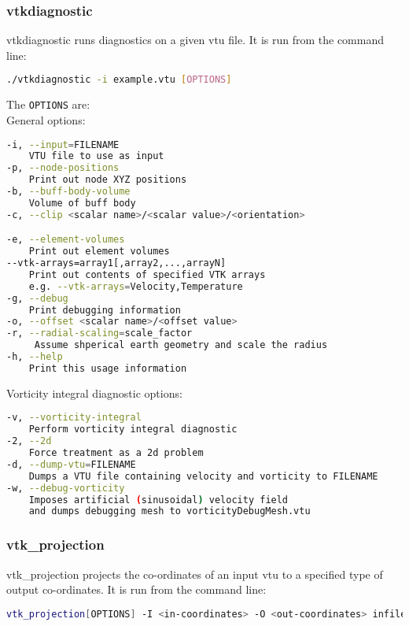 \subsubsection{vtkdiagnostic}
\label{sect:vtkdiagnostic}
vtkdiagnostic runs diagnostics on a given vtu file. It is run from the command line:
\begin{lstlisting}[language = Bash]
./vtkdiagnostic -i example.vtu [OPTIONS]
\end{lstlisting}

The \lstinline[language = Bash]+OPTIONS+ are: \\
General options:
\begin{lstlisting}[language = Bash]
-i, --input=FILENAME
	VTU file to use as input
-p, --node-positions
	Print out node XYZ positions
-b, --buff-body-volume
	Volume of buff body
-c, --clip <scalar name>/<scalar value>/<orientation>

-e, --element-volumes
	Print out element volumes
--vtk-arrays=array1[,array2,...,arrayN]
	Print out contents of specified VTK arrays
	e.g. --vtk-arrays=Velocity,Temperature
-g, --debug
	Print debugging information
-o, --offset <scalar name>/<offset value>
-r, --radial-scaling=scale_factor
	 Assume shperical earth geometry and scale the radius
-h, --help
	Print this usage information
\end{lstlisting}
Vorticity integral diagnostic options:
\begin{lstlisting}[language = Bash]
-v, --vorticity-integral
	Perform vorticity integral diagnostic
-2, --2d
	Force treatment as a 2d problem
-d, --dump-vtu=FILENAME
	Dumps a VTU file containing velocity and vorticity to FILENAME
-w, --debug-vorticity
	Imposes artificial (sinusoidal) velocity field
	and dumps debugging mesh to vorticityDebugMesh.vtu
\end{lstlisting}


\subsubsection{vtk\_projection}
\label{sect:vtkprojection}
vtk\_projection projects the co-ordinates of an input vtu to a specified type of output co-ordinates. It is run from the command line:
\begin{lstlisting}[language = Bash]
vtk_projection[OPTIONS] -I <in-coordinates> -O <out-coordinates> infile.vtu
\end{lstlisting}

